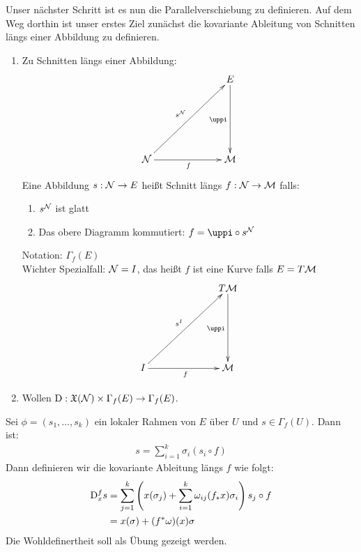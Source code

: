 
Unser nächster Schritt ist es nun die Parallelverschiebung zu definieren.
Auf dem Weg dorthin ist unser erstes Ziel zunächst die kovariante Ableitung von Schnitten längs einer Abbildung zu definieren.
\begin{enumerate}
\item Zu Schnitten längs einer Abbildung:
\begin{align}
\begin{xy}
  \xymatrix@=0.2\linewidth{
          &   E \ar[d]_{\pi} \\
      \mfka \ar[ur]^{s^\mfka} \ar[r]_f  &   \mfk
  }
\end{xy}
\end{align}
Eine Abbildung $s: \mathcal{N} \to E$ heißt Schnitt längs $f: \mathcal{N} \to \mathcal{M}$ falls:
\begin{enumerate}[label=\roman*]
  \item $s^{\mathcal{N}}$ ist glatt
  \item Das obere Diagramm kommutiert: $f = \pi \circ s^\mfka$
\end{enumerate}
Notation: $\Gamma_f (E)$\\
Wichter Spezialfall: $\mathcal{N} = I$, das heißt $f$ ist eine Kurve falls $E = T\mathcal{M}$
\begin{align}
\begin{xy}
  \xymatrix@=0.2\linewidth{
          &   T\mfk \ar[d]_{\pi} \\
      I \ar[ur]^{s^I} \ar[r]_f  &   \mfk
  }
\end{xy}
\end{align}
\item Wollen $\mathrm{D}: \mathfrak{X}(\mathcal{N}) \times \Gamma_f (E) \to \Gamma_f (E)$.
\end{enumerate}
\begin{defs}
Sei $\phi = (s_1, \dots, s_k)$ ein lokaler Rahmen von $E$ über $U$ und $s \in \Gamma_f (U)$. 
Dann ist:
\begin{align}
s = \sum^{k}_{i=1} \sigma_i (s_i \circ f)
\end{align}
Dann definieren wir die kovariante Ableitung längs $f$ wie folgt:
\begin{align}
\mathrm{D}^{f}_x s &= \sum^k_{j=1} \left( x(\sigma_j) + \sum^k_{i=1} \omega_{ij}(f_\ast x)\sigma_i \right) s_j \circ f\\
&= x(\sigma) + (f^\ast \omega)(x) \sigma
\end{align}
Die Wohldefinertheit soll als Übung gezeigt werden.
\end{defs}
